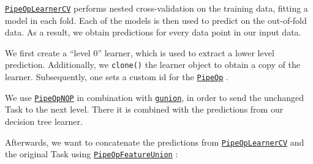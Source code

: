 \documentclass[]{article}
\newenvironment{Shaded}{\begin{snugshade}}{\end{snugshade}}
\newcommand{\DecValTok}[1]{\textcolor[rgb]{0.00,0.00,0.81}{#1}}
\newcommand{\KeywordTok}[1]{\textcolor[rgb]{0.13,0.29,0.53}{\textbf{#1}}}
\newcommand{\NormalTok}[1]{#1}
\newcommand{\OperatorTok}[1]{\textcolor[rgb]{0.81,0.36,0.00}{\textbf{#1}}}
\newcommand{\StringTok}[1]{\textcolor[rgb]{0.31,0.60,0.02}{#1}}
\renewenvironment{Shaded} {\begin{snugshade}\small} {\end{snugshade}}
\begin{document}
\href{https://mlr3pipelines.mlr-org.com/reference/mlr_pipeops_learner_cv.html}{\texttt{PipeOpLearnerCV}} performs nested cross-validation on the training data, fitting a model in each fold.
Each of the models is then used to predict on the out-of-fold data.
As a result, we obtain predictions for every data point in our input data.

We first create a ``level 0'' learner, which is used to extract a lower level prediction.
Additionally, we \texttt{clone()} the learner object to obtain a copy of the learner.
Subsequently, one sets a custom id for the \href{https://mlr3pipelines.mlr-org.com/reference/PipeOp.html}{\texttt{PipeOp}} .

\begin{Shaded}
\end{Shaded}

We use \href{https://mlr3pipelines.mlr-org.com/reference/mlr_pipeops_nop.html}{\texttt{PipeOpNOP}} in combination with \href{https://mlr3pipelines.mlr-org.com/reference/gunion.html}{\texttt{gunion}}, in order to send the unchanged Task to the next level.
There it is combined with the predictions from our decision tree learner.

\begin{Shaded}
\end{Shaded}

Afterwards, we want to concatenate the predictions from \href{https://mlr3pipelines.mlr-org.com/reference/mlr_pipeops_learner_cv.html}{\texttt{PipeOpLearnerCV}} and the original Task using \href{https://mlr3pipelines.mlr-org.com/reference/mlr_pipeops_featureunion.html}{\texttt{PipeOpFeatureUnion}} :

\begin{Shaded}
\end{Shaded}
\end{document}
